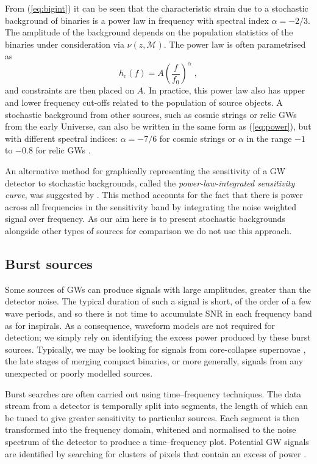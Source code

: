 From (\ref{eq:bigint}) it can be seen that the characteristic strain due to a stochastic background of binaries is a power law in frequency with spectral index $\alpha=-2/3$. The amplitude of the background depends on the population statistics of the binaries under consideration via $\nu(z,{\mathcal{M}})$. The power law is often parametrised as
\begin{equation}\label{eq:power} 
h_\mathrm{c}(f) = A\left(\frac{f}{f_{0}}\right)^{\alpha}\; , 
\end{equation}
and constraints are then placed on $A$. In practice, this power law also has upper and lower frequency cut-offs related to the population of source objects. A stochastic background from other sources, such as cosmic strings or relic GWs from the early Universe, can also be written in the same form as (\ref{eq:power}), but with different spectral indices: $\alpha=-7/6$ for cosmic strings or $\alpha$ in the range $-1$ to $-0.8$ for relic GWs \citep{Jenet}.

An alternative method for graphically representing the sensitivity of a GW detector to stochastic backgrounds, called the \emph{power-law-integrated sensitivity curve}, was suggested by \cite{2013PhRvD..88l4032T}. This method accounts for the fact that there is power across all frequencies in the sensitivity band by integrating the noise weighted signal over frequency. As our aim here is to present stochastic backgrounds alongside other types of sources for comparison we do not use this approach.


\subsection{Burst sources}\label{sec:bursts}

Some sources of GWs can produce signals with large amplitudes, greater than the detector noise. The typical duration of such a signal is short, of the order of a few wave periods, and so there is not time to accumulate SNR in each frequency band as for inspirals. As a consequence, waveform models are not required for detection; we simply rely on identifying the excess power produced by these burst sources. Typically, we may be looking for signals from core-collapse supernovae \citep{Ott2009}, the late stages of merging compact binaries, or more generally, signals from any unexpected or poorly modelled sources.

Burst searches are often carried out using time--frequency techniques. The data stream from a detector is temporally split into segments, the length of which can be tuned to give greater sensitivity to particular sources. Each segment is then transformed into the frequency domain, whitened and normalised to the noise spectrum of the detector to produce a time--frequency plot. Potential GW signals are identified by searching for clusters of pixels that contain an excess of power \citep[e.g.,][]{Bursts}.

